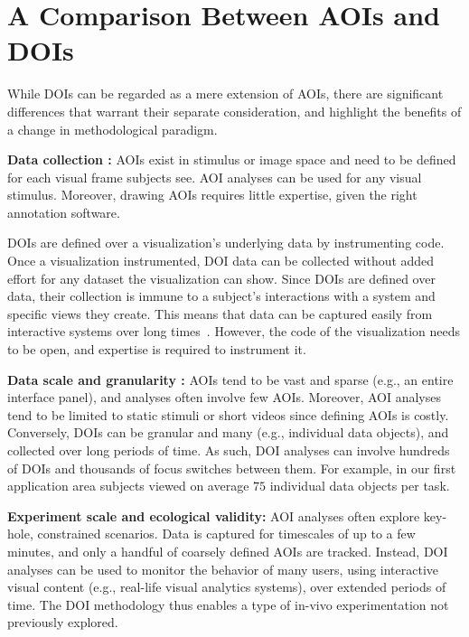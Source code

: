 \section{A Comparison Between AOIs and DOIs}
\label{sec:AOIvsDOI}


While DOIs can be regarded as a mere extension of AOIs, there are significant differences that warrant their separate consideration, and highlight the benefits of a change in methodological paradigm.

\noindent \textbf{Data collection :} AOIs exist in stimulus or image space and need to be defined for each visual frame subjects see. AOI analyses can be used for any visual stimulus. Moreover, drawing AOIs requires little expertise, given the right annotation software. 

DOIs are defined over a visualization's underlying data by instrumenting code. Once a visualization instrumented, DOI data can be collected without added effort for any dataset the visualization can show. Since DOIs are defined over data, their collection is immune to a subject's interactions with a system and specific views they create. This means that data can be captured easily from interactive systems over long times~\cite{Ala16}. However, the code of the visualization needs to be open, and expertise is required to instrument it.

\vspace{2mm}

\noindent \textbf{Data scale and granularity :} AOIs tend to be vast and sparse (e.g., an entire interface panel), and analyses often involve few AOIs. Moreover, AOI analyses tend to be limited to static stimuli or short videos since defining AOIs is costly. Conversely, DOIs can be granular and many (e.g., individual data objects), and collected over long periods of time. As such, DOI analyses can involve hundreds of DOIs and thousands of focus switches between them. For example, in our first application area subjects viewed on average $75$ individual data objects per task.

\vspace{2mm}

\noindent \textbf{Experiment scale and ecological validity:} AOI analyses often explore key-hole, constrained scenarios. Data is captured for timescales of up to a few minutes, and only a handful of coarsely defined AOIs are tracked. Instead, DOI analyses can be used to monitor the behavior of many users, using interactive visual content (e.g., real-life visual analytics systems), over extended periods of time. The DOI methodology thus enables a type of in-vivo experimentation not previously explored.

